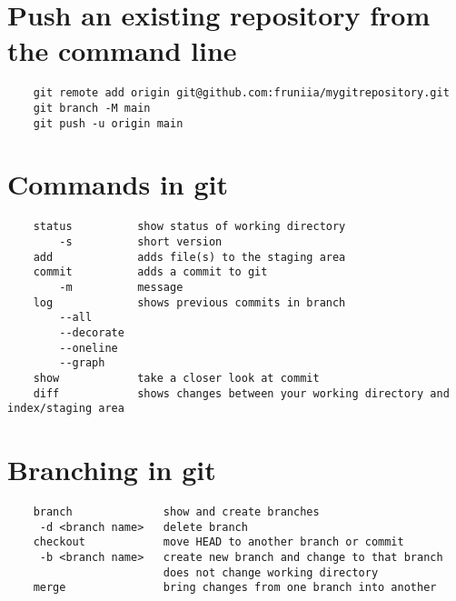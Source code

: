 \documentclass[10pt, a4paper]{article}
\begin{document}
\section*{Push an existing repository from the command line}
\begin{verbatim}
    git remote add origin git@github.com:fruniia/mygitrepository.git
    git branch -M main
    git push -u origin main
\end{verbatim}
\newpage
\section*{Commands in git}
\begin{verbatim}
    status          show status of working directory
        -s          short version
    add             adds file(s) to the staging area
    commit          adds a commit to git
        -m          message
    log             shows previous commits in branch
        --all
        --decorate
        --oneline
        --graph
    show            take a closer look at commit
    diff            shows changes between your working directory and index/staging area
\end{verbatim}
\section*{Branching in git}
\begin{verbatim}
    branch              show and create branches
     -d <branch name>   delete branch          
    checkout            move HEAD to another branch or commit
     -b <branch name>   create new branch and change to that branch
                        does not change working directory
    merge               bring changes from one branch into another
\end{verbatim}
\end{document}
